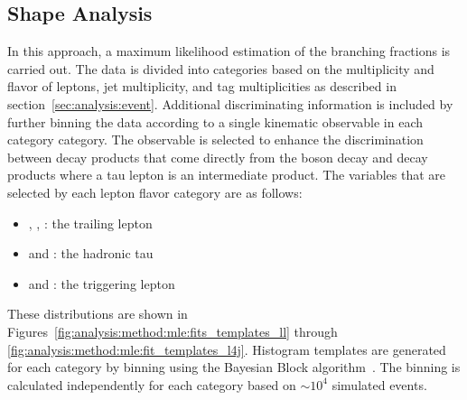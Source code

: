 
\subsection{Shape Analysis}
\label{sec:analysis:method:mle}

In this approach, a maximum likelihood estimation of the branching fractions is carried out.  The data is divided into categories based on the multiplicity and flavor of leptons, jet multiplicity, and \PQb tag multiplicities as described in section~\ref{sec:analysis:event}.  Additional discriminating information is included by further binning the data according to a single kinematic observable in each category category. The observable is selected to enhance the discrimination between decay products that come directly from the \PW boson decay and decay products where a tau lepton is an intermediate product.  The variables that are selected by each lepton flavor category are as follows:
\begin{itemize}
    \item \cee, \cmm, \cem: the trailing lepton \pt
    \item \cet and \cmt: the hadronic tau \pt
    \item \ceh and \cmh: the triggering lepton \pt
\end{itemize}
\noindent These distributions are shown in Figures~\ref{fig:analysis:method:mle:fits_templates_ll} through \ref{fig:analysis:method:mle:fit_templates_l4j}. Histogram templates are generated for each category by binning using the Bayesian Block algorithm~\cite{Pollack:2017srh}.  The binning is calculated independently for each category based on $\sim 10^{4}$ simulated events.
